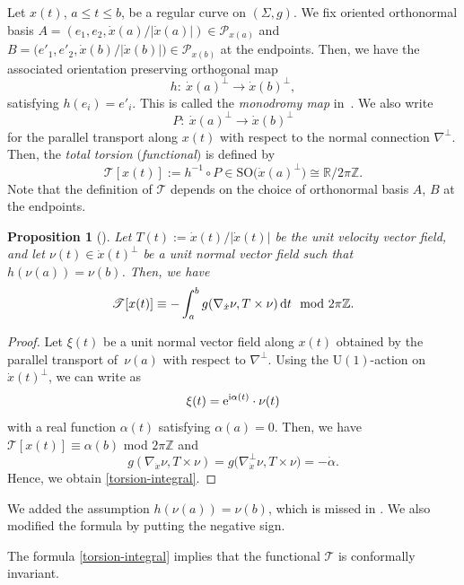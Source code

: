 \documentclass[pdftex]{sigma}
\numberwithin{equation}{section}
\newtheorem{Proposition}[Theorem]{Proposition}
 { \theoremstyle{definition}
\newtheorem{Definition}[Theorem]{Definition}
\newtheorem*{Notation}{Notation}
\newtheorem{Example}[Theorem]{Example}
\newtheorem{Remark}[Theorem]{Remark} }
\begin{document}
Let $x(t)$, $a\le t\le b$, be a regular curve on $(\Sigma, g)$. We fix oriented orthonormal basis $A=(e_1, e_2, \dot x(a)/|\dot x(a)|)\in \mathcal{P}_{x(a)}$ and
$B=\bigl(e'_1, e'_2, \dot x(b)/|\dot x(b)|\bigr)\in \mathcal{P}_{x(b)}$ at the endpoints.
Then, we have the associated orientation preserving orthogonal map
\[
h\colon\ \dot x(a)^\perp\longrightarrow \dot x(b)^\perp,
\]
satisfying $h(e_i)=e'_i$. This is called the {\it monodromy map} in~\cite{CKPP}. We also write
\[
P\colon\ \dot x(a)^\perp\longrightarrow \dot x(b)^\perp
\]
for the parallel transport along $x(t)$ with respect to the normal connection $\nabla^\perp$. Then, the {\it total torsion $($functional$)$} is defined by
\[
\mathscr{T}[x(t)]:=h^{-1}\circ P\in \mathrm{SO}\bigl(\dot x(a)^\perp\bigr)\cong \mathbb{R}/2\pi\mathbb{Z}.
\]
Note that the definition of $\mathscr{T}$ depends on the choice of orthonormal basis $A$, $B$ at the endpoints.
\begin{Proposition}[{\cite[Lemma 1]{CKPP}}]\label{torsion-integral-proposition}
Let $T(t):=\dot x(t)/|\dot x(t)|$ be the unit velocity vector field, and
let $\nu(t)\in \dot x(t)^\perp$ be a unit normal vector field such that $h(\nu(a))=\nu(b)$. Then, we have
\begin{equation}\label{torsion-integral}
\mathscr{T}[x(t)]\equiv -\int_a^b g(\nabla_{\dot x}\nu, T\times \nu)\,{\rm d}t\mod 2\pi\mathbb{Z}.
\end{equation}
\end{Proposition}
\begin{proof}
Let $\xi(t)$ be a unit normal vector field along $x(t)$ obtained by the parallel transport of~$\nu(a)$ with respect to $\nabla^\perp$. Using the $\mathrm{U}(1)$-action on $\dot x(t)^\perp$, we can write as
\[
\xi(t)= {\rm e}^{{\rm i}\alpha(t)}\cdot \nu(t)
\]
with a real function $\alpha(t)$ satisfying $\alpha(a)=0$. Then, we have $\mathscr{T}[x(t)]\equiv \alpha(b)$ mod $2\pi\mathbb{Z}$ and
\[
g(\nabla_{\dot x}\nu, T\times \nu)=g\bigl(\nabla^\perp_{\dot x}\nu, T\times \nu\bigr)=-\dot \alpha.
\]
Hence, we obtain \eqref{torsion-integral}.
\end{proof}

\begin{Remark}
We added the assumption $h(\nu(a))=\nu(b)$, which is missed in {\cite[Lemma 1]{CKPP}}. We also modified the formula by putting the negative sign.
\end{Remark}

The formula \eqref{torsion-integral} implies that the functional $\mathscr{T}$ is conformally invariant.
\end{document}
